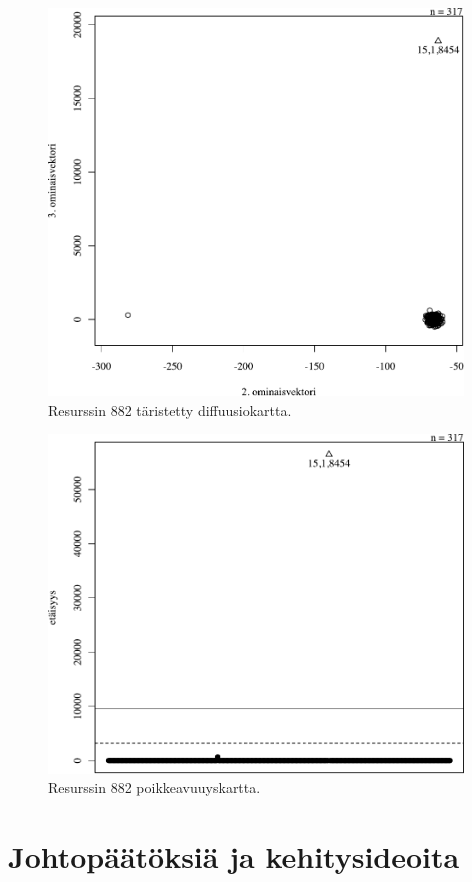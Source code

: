 \begin{figure}[p]
\centering
\includegraphics[width=11cm]{pics/diffuusiokuvat/service_882.pdf}
\caption{Resurssin 882 täristetty diffuusiokartta.}
\label{diffusio_882}
\end{figure}

\begin{figure}[p]
\centering
\includegraphics[width=11cm]{pics/tiheyskuvat/service_882.pdf}
\caption{Resurssin 882 poikkeavuuyskartta.}
\label{service_882}
\end{figure}

\section{Johtopäätöksiä ja kehitysideoita}

